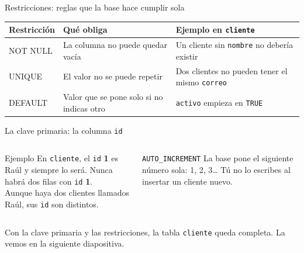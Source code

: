 \documentclass[aspectratio=169,10pt,c]{beamer}
\begin{document}
\begin{frame}{Restricciones: reglas que la base hace cumplir sola}
\vspace{0.3cm}
\begin{center}
\small
\begin{tabular}{>{\ttfamily}p{2.3cm}>{\raggedright\arraybackslash}p{4.0cm}>{\raggedright\arraybackslash}p{5.0cm}}
\toprule
\normalfont\bfseries Restricción & \bfseries Qué obliga & \bfseries Ejemplo en \texttt{cliente} \\
\midrule
NOT NULL & La columna no puede quedar vacía & Un cliente sin \texttt{nombre} no debería existir \\
UNIQUE & El valor no se puede repetir & Dos clientes no pueden tener el mismo \texttt{correo} \\
DEFAULT & Valor que se pone solo si no indicas otro & \texttt{activo} empieza en \texttt{TRUE} \\
\bottomrule
\end{tabular}
\end{center}
\end{frame}

\begin{frame}{La clave primaria: la columna \texttt{id}}
\vspace{0.25cm}
\begin{columns}[T,onlytextwidth]
\begin{exampleblock}{Ejemplo}
\small En \texttt{cliente}, el \texttt{id} \textbf{1} es Raúl y siempre lo será. Nunca habrá dos filas con \texttt{id} \textbf{1}.\\[3pt]
Aunque haya dos clientes llamados Raúl, sus \texttt{id} son distintos.
\end{exampleblock}
\begin{block}{\texttt{AUTO\_INCREMENT}}
\small La base pone el siguiente número sola: 1, 2, 3\ldots{} Tú no lo escribes al insertar un cliente nuevo.
\end{block}
\end{columns}
\vspace{0.3cm}
\small Con la clave primaria y las restricciones, la tabla \texttt{cliente} queda completa. La vemos en la siguiente diapositiva.
\end{frame}
\end{document}
